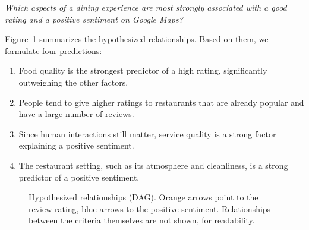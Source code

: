 \documentclass[11pt,a4paper]{article}
\newcommand{\pred}[1]{\textbf{P#1}}
\begin{document}
\begin{center}
\emph{Which aspects of a dining experience are most strongly associated with a
good rating and a positive sentiment on Google Maps?}
\end{center}

Figure~\ref{fig:dag} summarizes the hypothesized relationships. Based on
them, we formulate four predictions:

\begin{enumerate}[label=\pred{\arabic*}, leftmargin=2.2em, itemsep=1pt]
  \item Food quality is the strongest predictor of a high rating,
  significantly outweighing the other factors.
  \item People tend to give higher ratings to restaurants that are already
  popular and have a large number of reviews.
  \item Since human interactions still matter, service quality is a strong
  factor explaining a positive sentiment.
  \item The restaurant setting, such as its atmosphere and cleanliness, is a
  strong predictor of a positive sentiment.
\end{enumerate}

\begin{figure}[t]
\centering
{}
\caption{Hypothesized relationships (DAG). Orange arrows point to the review
rating, blue arrows to the positive sentiment. Relationships between the
criteria themselves are not shown, for readability.}
\label{fig:dag}
\end{figure}
\end{document}
